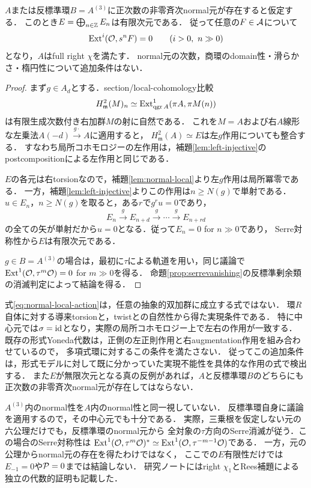 \documentclass[11pt,a4paper]{ltjsarticle}
\begin{document}
\begin{proposition}[一つのnormal切断からのSerre消滅]\label{prop:normal-vanishing}
$A$または反標準環$B=A^{(3)}$に正次数の非零斉次normal元が存在すると仮定する．
このとき$E=\bigoplus_{n\in\mathbb Z}E_n$は有限次元である．
従って任意の$F\in\mathcal A$について
\[
 \operatorname{Ext}^i(\mathcal O,s^nF)=0\qquad(i>0,\ n\gg0)
\]
となり，$A$はfull right $\chi$を満たす．
normal元の次数，商環のdomain性・滑らかさ・楕円性について追加条件はない．
\end{proposition}
\begin{proof}
まず$g\in A_d$とする．section/local-cohomology比較
\[
 H^2_{\mathfrak m}(M)_n\simeq
 \operatorname{Ext}^1_{\operatorname{qgr} A}(\pi A,\pi M(n))
\]
は有限生成次数付き右加群$M$の射に自然である．
これを$M=A$および右$A$線形な左乗法$A(-d)\xrightarrow{g\cdot}A$に適用すると，
$H^2_{\mathfrak m}(A)\simeq E$は左$g$作用についても整合する．
すなわち局所コホモロジーの左作用は，補題\ref{lem:left-injective}の
postcompositionによる左作用と同じである．

$E$の各元は右torsionなので，補題\ref{lem:normal-local}より左$g$作用は局所冪零である．
一方，補題\ref{lem:left-injective}よりこの作用は$n\geq N(g)$で単射である．
$u\in E_n$，$n\geq N(g)$を取ると，ある$r$で$g^ru=0$であり，
\[
 E_n\xrightarrow{g}E_{n+d}\xrightarrow{g}\cdots\xrightarrow{g}E_{n+rd}
\]
の全ての矢が単射だから$u=0$となる．従って$E_n=0$ for $n\gg0$であり，
Serre対称性から$E$は有限次元である．

$g\in B=A^{(3)}$の場合は，最初に$\tau$による軌道を用い，同じ議論で
$\operatorname{Ext}^1(\mathcal O,\tau^m\mathcal O)=0$ for $m\gg0$を得る．
命題\ref{prop:serrevanishing}の反標準剰余類の消滅判定によって結論を得る．
\end{proof}
\begin{remark}[形式モデルとの差と反例候補への制約]
式\eqref{eq:normal-local-action}は，任意の抽象的双加群に成立する式ではない．
環$R$自体に対する導来torsionと，twistとの自然性から得た実現条件である．
特に中心元では$\sigma=\operatorname{id}$となり，実際の局所コホモロジー上で左右の作用が一致する．
既存の形式Yoneda代数は，正側の左正則作用と右augmentation作用を組み合わせているので，
多項式環に対するこの条件を満たさない．
従ってこの追加条件は，形式モデルに対して既に分かっていた実現不能性を具体的な作用の式で検出する．
また$E$が無限次元となる真の反例があれば，$A$と反標準環$B$のどちらにも
正次数の非零斉次normal元が存在してはならない．
\end{remark}


\begin{remark}[反標準環への適用と追加条件の限界]
$A^{(3)}$内のnormal性を$A$内のnormal性と同一視していない．
反標準環自身に議論を適用するので，その中心元でも十分である．
実際，三乗根を仮定しない元の六公理だけでも，反標準環のnormal元から
全対象の$\tau$方向のSerre消滅が従う．この場合のSerre対称性は
$\operatorname{Ext}^1(\mathcal O,\tau^m\mathcal O)^*\simeq\operatorname{Ext}^1(\mathcal O,\tau^{-m-1}\mathcal O)$である．
一方，元の公理からnormal元の存在を得たわけではなく，
ここでの$E$有限性だけでは$E_{-1}=0$や$\mathcal P=0$までは結論しない．
研究ノートにはright $\chi_1$とRees補題による独立の代数的証明も記載した．
\end{remark}
\end{document}
